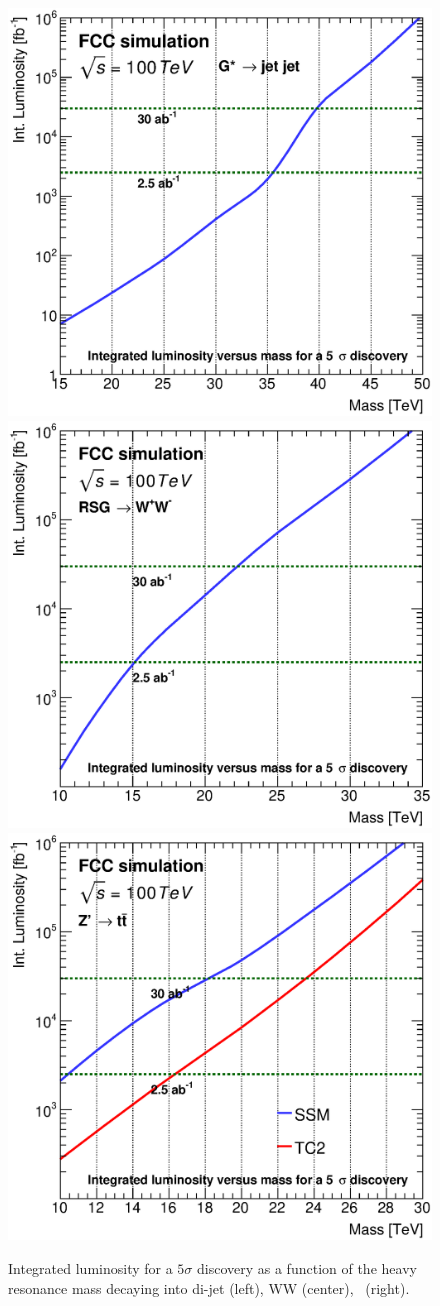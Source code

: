\documentclass{cernrep}
\begin{document}
\begin{figure}
  \centering
  \includegraphics[width=0.30\columnwidth]{Fig/DiscoveryPotential_jj_rootStyle.eps}
  \includegraphics[width=0.30\columnwidth]{Fig/DiscoveryPotential_ww_tagger_rootStyle.eps}
  \includegraphics[width=0.30\columnwidth]{Fig/DiscoveryPotential_tt_SSM_TC2_tagger_TRFbtag_rootStyle.eps}
  \caption{Integrated luminosity for a $5\sigma$ discovery as a function of the heavy resonance mass decaying into di-jet (left), WW (center), \ttbar\ (right).}
  \label{figure:hadronicresonances:resultsjj}
\end{figure}


\end{document}

